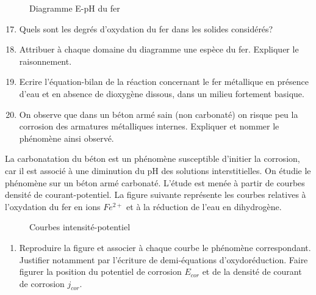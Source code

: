 \begin{figure}[h]
\begin{center}
\caption{Diagramme E-pH du fer}
\end{center}
\end{figure}

\begin{enumerate}
  \setcounter{enumi}{16}
\item \facile Quels sont les degrés d'oxydation du fer dans les solides considérés?
\item \facile Attribuer à chaque domaine du diagramme une espèce du fer. Expliquer le raisonnement.
\item \facile Ecrire l'équation-bilan de la réaction concernant le fer métallique en présence d'eau et en absence de dioxygène dissous, dans un milieu fortement basique.
\item \moyen On observe que dans un béton armé sain (non carbonaté) on risque peu la corrosion des armatures métalliques internes. Expliquer et nommer le phénomène ainsi observé.
\end{enumerate}
La carbonatation du béton est un phénomène susceptible d'initier la corrosion, car il est associé à une diminution du pH des solutions interstitielles. On étudie le phénomène sur un béton armé carbonaté. L'étude est menée à partir de courbes densité de courant-potentiel. La figure suivante représente les courbes relatives à l'oxydation du fer en ions $F e^{2+}$ et à la réduction de l'eau en dihydrogène.

\begin{figure}[h]
\begin{center}
\caption{Courbes intensité-potentiel}
\end{center}
\end{figure}

\begin{enumerate}[resume]
\item \moyen Reproduire la figure et associer à chaque courbe le phénomène correspondant. Justifier notamment par l'écriture de demi-équations d'oxydoréduction. Faire figurer la position du potentiel de corrosion $E_{c o r}$ et de la densité de courant de corrosion $j_{c o r}$.
\end{enumerate}


